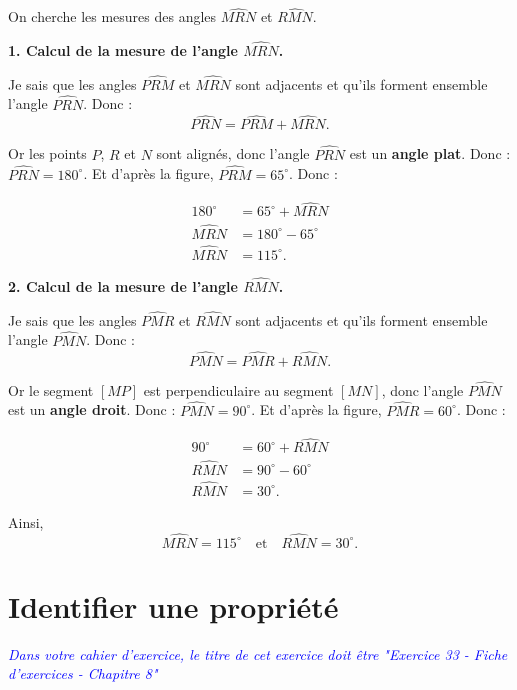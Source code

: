 \documentclass[answers]{exam}
\begin{document}
  \begin{solution}
On cherche les mesures des angles $\widehat{MRN}$ et $\widehat{RMN}$.

\medskip
\textbf{1. Calcul de la mesure de l'angle $\widehat{MRN}$.}

\medskip

Je sais que les angles $\widehat{PRM}$ et $\widehat{MRN}$ sont adjacents et qu'ils forment ensemble l'angle $\widehat{PRN}$.  
Donc :
\[
\widehat{PRN} = \widehat{PRM} + \widehat{MRN}.
\]

Or les points $P$, $R$ et $N$ sont alignés, donc l'angle $\widehat{PRN}$ est un \textbf{angle plat}.  
Donc : $\widehat{PRN} = 180^\circ$. Et d'après la figure, $\widehat{PRM} = 65^\circ$.  
Donc :

\begin{align}
180^\circ &= 65^\circ + \widehat{MRN} \\
\widehat{MRN} &= 180^\circ - 65^\circ \\
\widehat{MRN} &= 115^\circ.
\end{align}

\medskip
\textbf{2. Calcul de la mesure de l'angle $\widehat{RMN}$.}

Je sais que les angles $\widehat{PMR}$ et $\widehat{RMN}$ sont adjacents et qu'ils forment ensemble l'angle $\widehat{PMN}$.  
Donc :
\[
\widehat{PMN} = \widehat{PMR} + \widehat{RMN}.
\]

Or le segment $[MP]$ est perpendiculaire au segment $[MN]$, donc l'angle $\widehat{PMN}$ est un \textbf{angle droit}.  
Donc : $\widehat{PMN} = 90^\circ$. Et d'après la figure, $\widehat{PMR} = 60^\circ$.  
Donc :

\begin{align}
90^\circ &= 60^\circ + \widehat{RMN} \\
\widehat{RMN} &= 90^\circ - 60^\circ \\
\widehat{RMN} &= 30^\circ.
\end{align}

\medskip

Ainsi,
\[
\boxed{\widehat{MRN} = 115^\circ \quad\text{et}\quad \widehat{RMN} = 30^\circ.}
\]
\end{solution}


\section*{Identifier une propriété}
\textcolor{blue}{\textit{Dans votre cahier d'exercice, le titre de cet exercice doit être "Exercice 33 - Fiche d'exercices - Chapitre 8"}}
\end{document}
